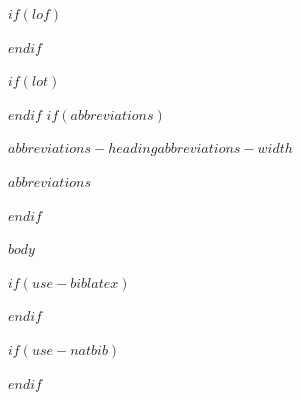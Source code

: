 \documentclass[a4paper, $if(page-layout)$$page-layout$$endif$]{templates/ociamthesis}
\begin{document}
\begin{romanpages}
\flushbottom

\tableofcontents

$if(lof)$
\listoffigures
	\mtcaddchapter
$endif$

$if(lot)$
\listoftables
  \mtcaddchapter
$endif$
$if(abbreviations)$
\begin{mclistof}{$abbreviations-heading$}{$abbreviations-width$}

$abbreviations$

\end{mclistof} 

$endif$

\end{romanpages}

\flushbottom

$body$

$if(use-biblatex)$
\setlength{\baselineskip}{0pt} %

{\renewcommand*\MakeUppercase[1]{#1}%
\printbibliography[heading=none]}

$endif$

$if(use-natbib)$

$endif$
\end{document}
